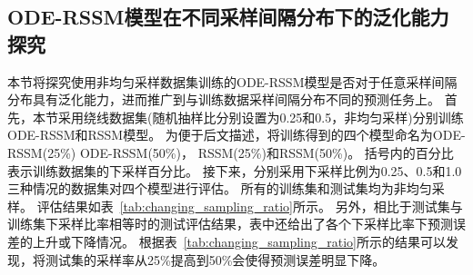 \subsection{ODE-RSSM模型在不同采样间隔分布下的泛化能力探究}
本节将探究使用非均匀采样数据集训练的ODE-RSSM模型是否对于任意采样间隔分布具有泛化能力，进而推广到与训练数据采样间隔分布不同的预测任务上。
首先，本节采用绕线数据集(随机抽样比分别设置为0.25和0.5，非均匀采样)分别训练ODE-RSSM和RSSM模型。
为便于后文描述，将训练得到的四个模型命名为ODE-RSSM(25\%) ODE-RSSM(50\%)， RSSM(25\%)和RSSM(50\%)。
括号内的百分比表示训练数据集的下采样百分比。
接下来，分别采用下采样比例为0.25、0.5和1.0三种情况的数据集对四个模型进行评估。
所有的训练集和测试集均为非均匀采样。
评估结果如表~\ref{tab:changing_sampling_ratio}所示。
另外，相比于测试集与训练集下采样比率相等时的测试评估结果，表中还给出了各个下采样比率下预测误差的上升或下降情况。
根据表~\ref{tab:changing_sampling_ratio}所示的结果可以发现，将测试集的采样率从25\%提高到50\%会使得预测误差明显下降。

